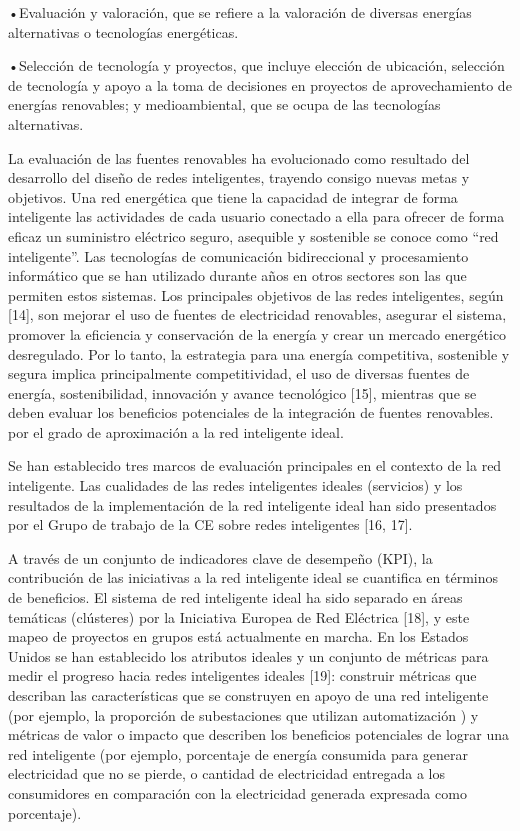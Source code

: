 \documentclass[
]{article}
\begin{document}
•Evaluación y valoración, que se refiere a la valoración de diversas
energías alternativas o tecnologías energéticas.

•Selección de tecnología y proyectos, que incluye elección de ubicación,
selección de tecnología y apoyo a la toma de decisiones en proyectos de
aprovechamiento de energías renovables; y medioambiental, que se ocupa
de las tecnologías alternativas.

La evaluación de las fuentes renovables ha evolucionado como resultado
del desarrollo del diseño de redes inteligentes, trayendo consigo nuevas
metas y objetivos. Una red energética que tiene la capacidad de integrar
de forma inteligente las actividades de cada usuario conectado a ella
para ofrecer de forma eficaz un suministro eléctrico seguro, asequible y
sostenible se conoce como ``red inteligente''. Las tecnologías de
comunicación bidireccional y procesamiento informático que se han
utilizado durante años en otros sectores son las que permiten estos
sistemas. Los principales objetivos de las redes inteligentes, según
{[}14{]}, son mejorar el uso de fuentes de electricidad renovables,
asegurar el sistema, promover la eficiencia y conservación de la energía
y crear un mercado energético desregulado. Por lo tanto, la estrategia
para una energía competitiva, sostenible y segura implica principalmente
competitividad, el uso de diversas fuentes de energía, sostenibilidad,
innovación y avance tecnológico {[}15{]}, mientras que se deben evaluar
los beneficios potenciales de la integración de fuentes renovables. por
el grado de aproximación a la red inteligente ideal.

Se han establecido tres marcos de evaluación principales en el contexto
de la red inteligente. Las cualidades de las redes inteligentes ideales
(servicios) y los resultados de la implementación de la red inteligente
ideal han sido presentados por el Grupo de trabajo de la CE sobre redes
inteligentes {[}16, 17{]}.

A través de un conjunto de indicadores clave de desempeño (KPI), la
contribución de las iniciativas a la red inteligente ideal se cuantifica
en términos de beneficios. El sistema de red inteligente ideal ha sido
separado en áreas temáticas (clústeres) por la Iniciativa Europea de Red
Eléctrica {[}18{]}, y este mapeo de proyectos en grupos está actualmente
en marcha. En los Estados Unidos se han establecido los atributos
ideales y un conjunto de métricas para medir el progreso hacia redes
inteligentes ideales {[}19{]}: construir métricas que describan las
características que se construyen en apoyo de una red inteligente (por
ejemplo, la proporción de subestaciones que utilizan automatización ) y
métricas de valor o impacto que describen los beneficios potenciales de
lograr una red inteligente (por ejemplo, porcentaje de energía consumida
para generar electricidad que no se pierde, o cantidad de electricidad
entregada a los consumidores en comparación con la electricidad generada
expresada como porcentaje).
\end{document}
